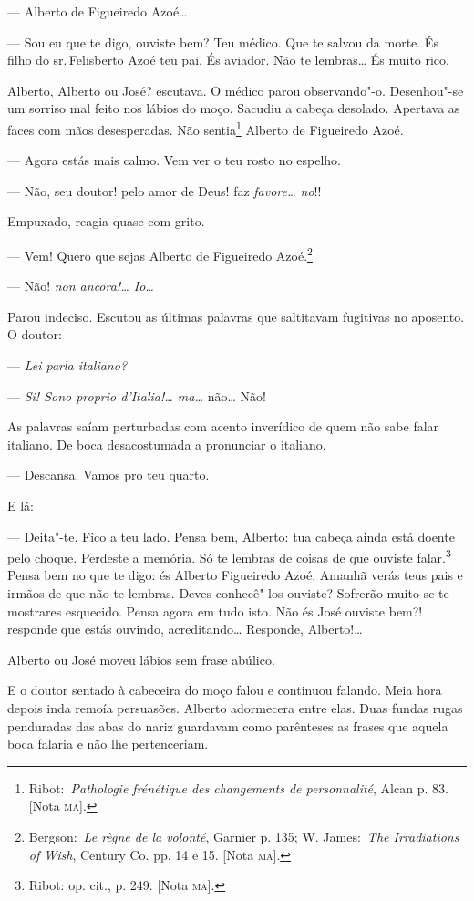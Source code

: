 --- Alberto de Figueiredo Azoé\ldots{}

--- Sou eu que te digo, ouviste bem? Teu médico. Que te salvou da morte.
És filho do sr.\,Felisberto Azoé teu pai. És aviador. Não te lembras\ldots{}
És muito rico.

Alberto, Alberto ou José? escutava. O médico parou observando"-o.
Desenhou"-se um sorriso mal feito nos lábios do moço. Sacudiu a cabeça
desolado. Apertava as faces com mãos desesperadas. Não sentia\footnote{Ribot:~\emph{Pathologie
  frénétique des changements de personnalité}, Alcan p. 83. {[}Nota
  \textsc{ma}{]}.} Alberto de Figueiredo Azoé.

--- Agora estás mais calmo. Vem ver o teu rosto no espelho.

--- Não, seu doutor! pelo amor de Deus! faz \emph{favore\ldots{} no}!!

Empuxado, reagia quase com grito.

--- Vem! Quero que sejas Alberto de Figueiredo Azoé.\footnote{Bergson:~\emph{Le
  règne de la volonté}, Garnier p. 135; W. James:~\emph{The Irradiations
  of Wish}, Century Co. pp. 14 e 15. {[}Nota \textsc{ma}{]}.}

--- Não! \emph{non ancora!\ldots{} Io\ldots{}}

Parou indeciso. Escutou as últimas palavras que saltitavam fugitivas no
aposento. O doutor:

--- \emph{Lei parla italiano?}

--- \emph{Si! Sono proprio d'Italia!\ldots{} ma\ldots{}} não\ldots{} Não!

As palavras saíam perturbadas com acento inverídico de quem não sabe
falar italiano. De boca desacostumada a pronunciar o italiano.

--- Descansa. Vamos pro teu quarto.

E lá:

--- Deita"-te. Fico a teu lado. Pensa bem, Alberto: tua cabeça ainda está
doente pelo choque. Perdeste a memória. Só te lembras de coisas de que
ouviste falar.\footnote{Ribot: op. cit., p. 249. {[}Nota \textsc{ma}{]}.} Pensa
bem no que te digo: és Alberto Figueiredo Azoé. Amanhã verás teus pais e
irmãos de que não te lembras. Deves conhecê"-los ouviste? Sofrerão muito
se te mostrares esquecido. Pensa agora em tudo isto. Não és José ouviste
bem?! responde que estás ouvindo, acreditando\ldots{} Responde, Alberto!\ldots{}

Alberto ou José moveu lábios sem frase abúlico.

E o doutor sentado à cabeceira do moço falou e continuou falando. Meia
hora depois inda remoía persuasões. Alberto adormecera entre elas. Duas
fundas rugas penduradas das abas do nariz guardavam como parênteses as
frases que aquela boca falaria e não lhe pertenceriam.

